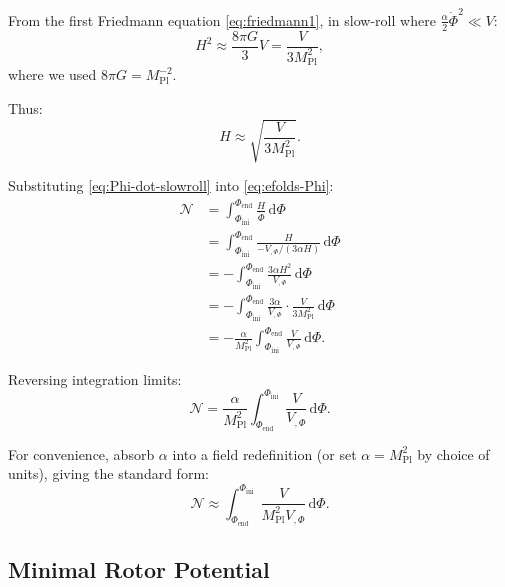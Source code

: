 \documentclass[11pt,a4paper]{article}
\numberwithin{equation}{section}
\theoremstyle{plain}
\theoremstyle{definition}
\theoremstyle{remark}
\newcommand{\dd}{\mathrm{d}}
\begin{document}
From the first Friedmann equation \eqref{eq:friedmann1}, in slow-roll where $\frac{\alpha}{2}\dot{\Phi}^2 \ll V$:
\begin{equation}
H^2 \approx \frac{8\pi G}{3}V = \frac{V}{3M_{\mathrm{Pl}}^2},
\end{equation}
where we used $8\pi G = M_{\mathrm{Pl}}^{-2}$.

Thus:
\begin{equation}
H \approx \sqrt{\frac{V}{3M_{\mathrm{Pl}}^2}}.
\label{eq:H-slowroll}
\end{equation}

Substituting \eqref{eq:Phi-dot-slowroll} into \eqref{eq:efolds-Phi}:
\begin{align}
\mathcal{N} &= \int_{\Phi_{\mathrm{ini}}}^{\Phi_{\mathrm{end}}} \frac{H}{\dot{\Phi}}\,\dd\Phi\\
&= \int_{\Phi_{\mathrm{ini}}}^{\Phi_{\mathrm{end}}} \frac{H}{-V_{,\Phi}/(3\alpha H)}\,\dd\Phi\\
&= -\int_{\Phi_{\mathrm{ini}}}^{\Phi_{\mathrm{end}}} \frac{3\alpha H^2}{V_{,\Phi}}\,\dd\Phi\\
&= -\int_{\Phi_{\mathrm{ini}}}^{\Phi_{\mathrm{end}}} \frac{3\alpha}{V_{,\Phi}}\cdot\frac{V}{3M_{\mathrm{Pl}}^2}\,\dd\Phi\\
&= -\frac{\alpha}{M_{\mathrm{Pl}}^2}\int_{\Phi_{\mathrm{ini}}}^{\Phi_{\mathrm{end}}} \frac{V}{V_{,\Phi}}\,\dd\Phi.
\end{align}

Reversing integration limits:
\begin{equation}
\mathcal{N} = \frac{\alpha}{M_{\mathrm{Pl}}^2}\int_{\Phi_{\mathrm{end}}}^{\Phi_{\mathrm{ini}}} \frac{V}{V_{,\Phi}}\,\dd\Phi.
\label{eq:efolds-integral}
\end{equation}

For convenience, absorb $\alpha$ into a field redefinition (or set $\alpha = M_{\mathrm{Pl}}^2$ by choice of units), giving the standard form:
\begin{equation}
\mathcal{N} \approx \int_{\Phi_{\mathrm{end}}}^{\Phi_{\mathrm{ini}}}\frac{V}{M_{\mathrm{Pl}}^2 V_{,\Phi}}\,\dd\Phi.
\label{eq:efolds-standard}
\end{equation}

\subsection{Minimal Rotor Potential}
\end{document}
